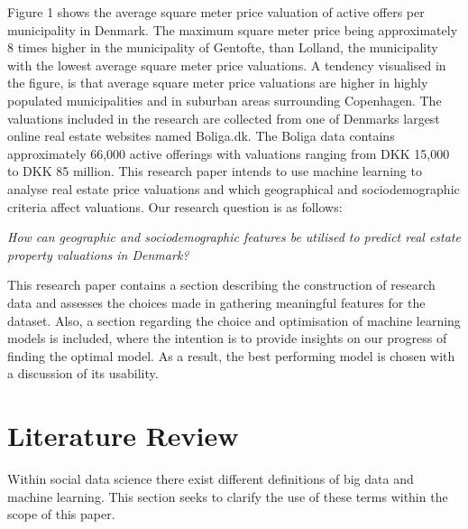 \documentclass[12pt,a4paper]{article}
\begin{document}
Figure 1 shows the average square meter price valuation of active offers per municipality in Denmark. The maximum square meter price being approximately 8 times higher in the municipality of Gentofte, than Lolland, the municipality with the lowest average square meter price valuations. A tendency visualised in the figure, is that average square meter price valuations are higher in highly populated municipalities and in suburban areas surrounding Copenhagen. \newline
The valuations included in the research are collected from one of Denmarks largest online real estate websites named Boliga.dk. The Boliga data contains approximately 66,000 active offerings with valuations ranging from DKK 15,000 to DKK 85 million. This research paper intends to use machine learning to analyse real estate price valuations and which geographical and sociodemographic criteria affect valuations. Our research question is as follows: 
\begin{center}
 \textit{How can geographic and sociodemographic features be utilised to predict real estate property valuations in Denmark?}
\end{center}
This research paper contains a section describing the construction of research data and assesses the choices made in gathering meaningful features for the dataset. Also, a section regarding the choice and optimisation of machine learning models is included, where the intention is to provide insights on our progress of finding the optimal model. As a result, the best performing model is chosen with a discussion of its usability. 

\section{Literature Review}
Within social data science there exist different definitions of big data and machine learning. This section seeks to clarify the use of these terms within the scope of this paper.
\end{document}
